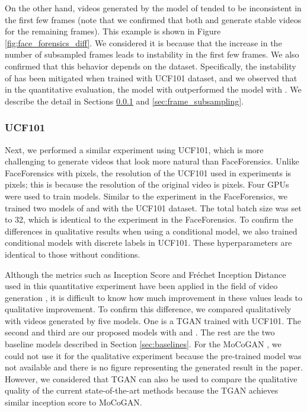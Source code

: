 \documentclass[twocolumn]{svjour3}
\def\Fig#1{Figure \ref{fig:#1}}
\def\Sec#1{Section \ref{sec:#1}}
\begin{document}
On the other hand, videos generated by the model of  tended to be inconsistent in the first few frames
(note that we confirmed that both  and  generate stable videos for the remaining frames).
This example is shown in \Fig{face_forensics_diff}.
We considered it is because that the increase in the number of subsampled frames
leads to instability in the first few frames.
We also confirmed that this behavior depends on the dataset.
Specifically, the instability of  has been mitigated when trained with UCF101 dataset, and we observed that in the quantitative evaluation, the model with  outperformed the model with .
We describe the detail in Sections \ref{sec:qualitative_ucf101} and \ref{sec:frame_subsampling}.

\subsubsection{UCF101}
\label{sec:qualitative_ucf101}







Next, we performed a similar experiment using UCF101,
which is more challenging to generate videos that look more natural than FaceForensics.
Unlike FaceForensics with  pixels,
the resolution of the UCF101 used in experiments is  pixels;
this is because the resolution of the original video is  pixels.
Four GPUs were used to train models.
Similar to the experiment in the FaceForensics, we trained two models of  and  with the UCF101 dataset.
The total batch size was set to 32, which is identical to the experiment in the FaceForensics.
To confirm the differences in qualitative results when using a conditional model,
we also trained conditional models with discrete labels in UCF101.
These hyperparameters are identical to those without conditions.















Although the metrics such as Inception Score and Fr\'echet Inception Distance used in
this quantitative experiment have been applied in the field of video generation
\cite{Saito2017,Tulyakov2018,Unterthiner2018},
it is difficult to know how much improvement in these values leads to qualitative improvement.
To confirm this difference, we compared qualitatively with videos generated by five models.
One is a TGAN \cite{Saito2017} trained with UCF101.
The second and third are our proposed models with  and .
The rest are the two baseline models described in \Sec{baselines}.
For the MoCoGAN \cite{Tulyakov2018},
we could not use it for the qualitative experiment
because the pre-trained model was not available and
there is no figure representing the generated result in the paper.
However, we considered that TGAN can also be used to compare the qualitative quality of
the current state-of-the-art methods because the TGAN achieves similar inception score to MoCoGAN.
\end{document}
